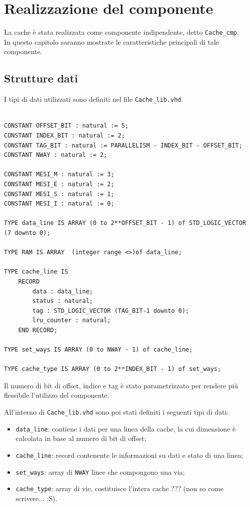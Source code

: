 \clearpage{\pagestyle{empty}\cleardoublepage}

\chapter{Realizzazione del componente}

La cache \`e stata realizzata come componente indipendente, detto \texttt{Cache\_cmp}.\\
In questo capitolo saranno mostrate le caratteristiche principali di tale componente.

\section{Strutture dati}

I tipi di dati utilizzati sono definiti nel file \texttt{Cache\_lib.vhd}.


\begin{lstlisting}

CONSTANT OFFSET_BIT : natural := 5;
CONSTANT INDEX_BIT : natural := 2;
CONSTANT TAG_BIT : natural := PARALLELISM - INDEX_BIT - OFFSET_BIT;
CONSTANT NWAY : natural := 2;

CONSTANT MESI_M : natural := 3;
CONSTANT MESI_E : natural := 2;
CONSTANT MESI_S : natural := 1;
CONSTANT MESI_I : natural := 0;

TYPE data_line IS ARRAY (0 to 2**OFFSET_BIT - 1) of STD_LOGIC_VECTOR (7 downto 0);

TYPE RAM IS ARRAY  (integer range <>)of data_line;

TYPE cache_line IS 
	RECORD
		data : data_line;
		status : natural;
		tag : STD_LOGIC_VECTOR (TAG_BIT-1 downto 0);
		lru_counter : natural;
	END RECORD;

TYPE set_ways IS ARRAY (0 to NWAY - 1) of cache_line;
		
TYPE cache_type IS ARRAY (0 to 2**INDEX_BIT - 1) of set_ways;
\end{lstlisting}


Il numero di bit di offset, indice e tag \`e stato parametrizzato per rendere pi\`u flessibile l'utilizzo del componente.

All'interno di \texttt{Cache\_lib.vhd} sono poi stati definiti i seguenti tipi di dati:
\begin{itemize}
  \item \texttt{data\_line}: contiene i dati per una linea della cache, la cui dimensione \`e calcolata in base al numero di bit di offset;
  \item \texttt{cache\_line}: record contenente le informazioni su dati e stato di una linea;
  \item \texttt{set\_ways}: array di \texttt{NWAY} linee che compongono una via;
  \item \texttt{cache\_type}: array di vie, costituisce l'intera cache ??? (non so come scrivere... :S).
\end{itemize}


